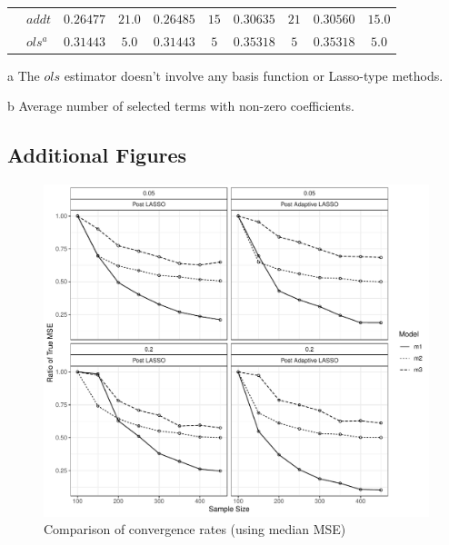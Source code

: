 \begin{table}[!htbp]
{\begin{threeparttable}
\begin{tabular}{llcccccccc}
            & $addt$ & $0.26477$ & $21.0$ & $0.26485$ & $15$ & $0.30635$ & $21$ & $0.30560$ & $15.0$ \\
            & $ols^a$ & $0.31443$ & $5.0$ & $0.31443$ & $5$ & $0.35318$ & $5$ & $0.35318$ & $5.0$ \\
            \hline 
            \hline
        \end{tabular}
        \begin{tablenotes}
            \item [a] The $ols$ estimator doesn't involve any basis function or Lasso-type methods.
            \item [b] Average number of selected terms with non-zero coefficients.
        \end{tablenotes}
        \end{threeparttable}
        }
    \end{table} 

\newpage

\subsection{Additional Figures}\label{convergence_rates_median_MSE}

    \begin{figure}[H]
	\includegraphics[width = 1.0\textwidth] {Graphics/rate.median.plot.pdf}
	\caption{Comparison of convergence rates (using median MSE)}
	\label{rate.median.plot}
    \end{figure}